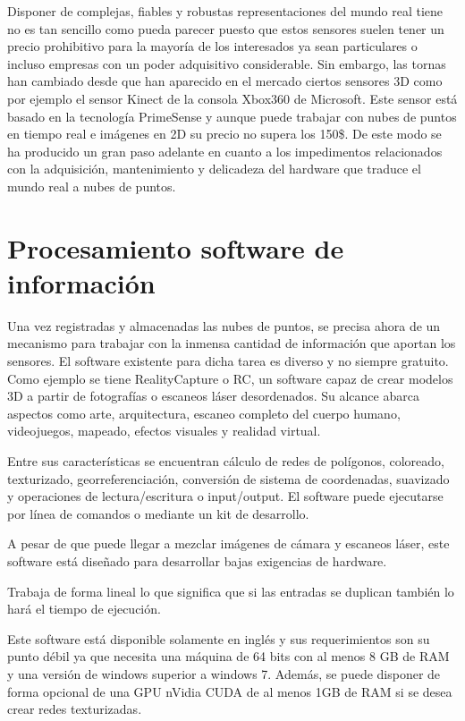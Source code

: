 Disponer de complejas, fiables y robustas representaciones del mundo real tiene no es tan sencillo como pueda parecer puesto que estos sensores suelen tener un precio prohibitivo para la mayoría de los interesados ya sean particulares o incluso empresas con un poder adquisitivo considerable. Sin embargo, las tornas han cambiado desde que han aparecido en el mercado ciertos sensores 3D como por ejemplo el sensor Kinect de la consola Xbox360 de Microsoft. Este sensor está basado en la tecnología PrimeSense y aunque puede trabajar con nubes de puntos en tiempo real e imágenes en 2D su precio no supera los 150\$. De este modo se ha producido un gran paso adelante en cuanto a los impedimentos relacionados con la adquisición, mantenimiento y delicadeza del hardware que traduce el mundo real a nubes de puntos.

\section{Procesamiento software de información }

Una vez registradas y almacenadas las nubes de puntos, se precisa ahora de un mecanismo para trabajar con la inmensa cantidad de información que aportan los sensores. El software existente para dicha tarea es diverso y no siempre gratuito. Como ejemplo se tiene RealityCapture o RC, un software capaz de crear modelos 3D a partir de fotografías o escaneos láser desordenados. Su alcance abarca aspectos como arte, arquitectura, escaneo completo del cuerpo humano, videojuegos, mapeado, efectos visuales y realidad virtual.

Entre sus características se encuentran cálculo de redes de polígonos, coloreado, texturizado, georreferenciación, conversión de sistema de coordenadas, suavizado y operaciones de lectura/escritura o input/output.
El software puede ejecutarse por línea de comandos o mediante un kit de desarrollo.

A pesar de que puede llegar a mezclar imágenes de cámara y escaneos láser, este software está diseñado para desarrollar bajas exigencias de hardware. 

Trabaja de forma lineal lo que significa que si las entradas se duplican también lo hará el tiempo de ejecución.

Este software está disponible solamente en inglés y sus requerimientos son su punto débil ya que necesita una máquina de 64 bits con al menos 8 GB de RAM y una versión de windows superior a windows 7. Además, se puede disponer de forma opcional de una GPU nVidia CUDA de al menos 1GB de RAM si se desea crear redes texturizadas.

